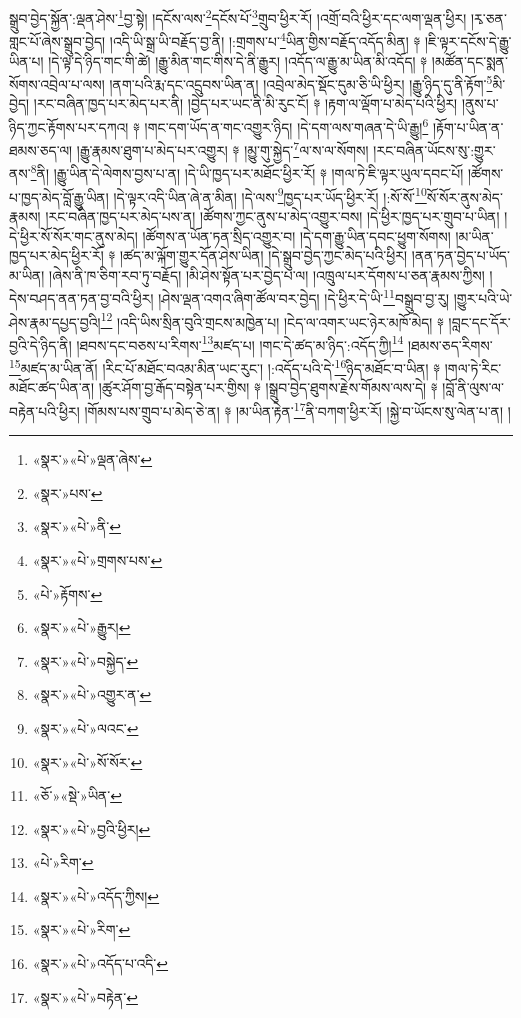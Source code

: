 སྒྲུབ་བྱེད་སྐྱོན་:ལྡན་ཤེས་\footnote{«སྣར་»«པེ་»ལྡན་ཞེས་}བྱ་སྟེ། །དངོས་ལས་\footnote{«སྣར་»པས་}དངོས་པོ་\footnote{«སྣར་»«པེ་»ནི་}གྲུབ་ཕྱིར་རོ། །འགྲོ་བའི་ཕྱིར་དང་ལག་ལྡན་ཕྱིར། །རྭ་ཅན་གླང་པོ་ཞེས་སྒྲུབ་བྱེད། །འདི་ཡི་སྒྲ་ཡི་བརྗོད་བྱ་ནི། །:གྲགས་པ་\footnote{«སྣར་»«པེ་»གྲགས་པས་}ཡིན་གྱིས་བརྗོད་འདོད་མིན། ༈ །ཇི་ལྟར་དངོས་དེ་རྒྱུ་ཡིན་པ། །དེ་ལྟ་དེ་ཉིད་གང་གི་ཚེ། །རྒྱུ་མིན་གང་གིས་དེ་ནི་རྒྱུར། །འདོད་ལ་རྒྱུ་མ་ཡིན་མི་འདོད། ༈ །མཚོན་དང་སྨན་སོགས་འབྲེལ་པ་ལས། །ནག་པའི་རྨ་དང་འདྲུབས་ཡིན་ན། །འབྲེལ་མེད་སྡོང་དུམ་ཅི་ཡི་ཕྱིར། །རྒྱུ་ཉིད་དུ་ནི་རྟོག་\footnote{«པེ་»རྟོགས་}མི་བྱེད། །རང་བཞིན་ཁྱད་པར་མེད་པར་ནི། །བྱེད་པར་ཡང་ནི་མི་རུང་ངོ། ༈ །རྟག་ལ་ལྡོག་པ་མེད་པའི་ཕྱིར། །ནུས་པ་ཉིད་ཀྱང་རྟོགས་པར་དཀའ། ༈ །གང་དག་ཡོད་ན་གང་འགྱུར་ཉིད། །དེ་དག་ལས་གཞན་དེ་ཡི་རྒྱུ།\footnote{«སྣར་»«པེ་»རྒྱུར།} །རྟོག་པ་ཡིན་ན་ཐམས་ཅད་ལ། །རྒྱུ་རྣམས་ཐུག་པ་མེད་པར་འགྱུར། ༈ །མྱུ་གུ་སྐྱེད་\footnote{«སྣར་»«པེ་»བསྐྱེད་}ལ་ས་ལ་སོགས། །རང་བཞིན་ཡོངས་སུ་:གྱུར་ནས་\footnote{«སྣར་»«པེ་»འགྱུར་ན་}ནི། །རྒྱུ་ཡིན་དེ་ལེགས་བྱས་པ་ན། །དེ་ཡི་ཁྱད་པར་མཐོང་ཕྱིར་རོ། ༈ །གལ་ཏེ་ཇི་ལྟར་ཡུལ་དབང་པོ། །ཚོགས་པ་ཁྱད་མེད་བློ་རྒྱུ་ཡིན། །དེ་ལྟར་འདི་ཡིན་ཞེ་ན་མིན། །དེ་ལས་\footnote{«སྣར་»«པེ་»ལའང་}ཁྱད་པར་ཡོད་ཕྱིར་རོ། །:སོ་སོ་\footnote{«སྣར་»«པེ་»སོ་སོར་}སོ་སོར་ནུས་མེད་རྣམས། །རང་བཞིན་ཁྱད་པར་མེད་པས་ན། །ཚོགས་ཀྱང་ནུས་པ་མེད་འགྱུར་བས། །དེ་ཕྱིར་ཁྱད་པར་གྲུབ་པ་ཡིན། །དེ་ཕྱིར་སོ་སོར་གང་ནུས་མེད། །ཚོགས་ན་ཡོན་ཏན་སྲིད་འགྱུར་བ། །དེ་དག་རྒྱུ་ཡིན་དབང་ཕྱུག་སོགས། །མ་ཡིན་ཁྱད་པར་མེད་ཕྱིར་རོ། ༈ །ཚད་མ་ལྐོག་གྱུར་དོན་ཤེས་ཡིན། །དེ་སྒྲུབ་བྱེད་ཀྱང་མེད་པའི་ཕྱིར། །ནན་ཏན་བྱེད་པ་ཡོད་མ་ཡིན། །ཞེས་ནི་ཁ་ཅིག་རབ་ཏུ་བརྗོད། །མི་ཤེས་སྟོན་པར་བྱེད་པ་ལ། །འཁྲུལ་པར་དོགས་པ་ཅན་རྣམས་ཀྱིས། །དེས་བཤད་ནན་ཏན་བྱ་བའི་ཕྱིར། །ཤེས་ལྡན་འགའ་ཞིག་ཚོལ་བར་བྱེད། །དེ་ཕྱིར་དེ་ཡི་\footnote{«ཅོ་»«སྡེ་»ཡིན་}བསྒྲུབ་བྱ་རུ། །གྱུར་པའི་ཡེ་ཤེས་རྣམ་དཔྱད་བྱའི།\footnote{«སྣར་»«པེ་»བྱའི་ཕྱིར།} །འདི་ཡིས་སྲིན་བུའི་གྲངས་མཁྱེན་པ། །ངེད་ལ་འགར་ཡང་ཉེར་མཁོ་མེད། ༈ །བླང་དང་དོར་བྱའི་དེ་ཉིད་ནི། །ཐབས་དང་བཅས་པ་རིགས་\footnote{«པེ་»རིག་}མཛད་པ། །གང་དེ་ཚད་མ་ཉིད་:འདོད་ཀྱི།\footnote{«སྣར་»«པེ་»འདོད་ཀྱིས།} །ཐམས་ཅད་རིགས་\footnote{«སྣར་»«པེ་»རིག་}མཛད་མ་ཡིན་ནོ། །རིང་པོ་མཐོང་བའམ་མིན་ཡང་རུང་། །:འདོད་པའི་དེ་\footnote{«སྣར་»«པེ་»འདོད་པ་འདི་}ཉིད་མཐོང་བ་ཡིན། ༈ །གལ་ཏེ་རིང་མཐོང་ཚད་ཡིན་ན། །ཚུར་ཤོག་བྱ་རྒོད་བསྟེན་པར་གྱིས། ༈ །སྒྲུབ་བྱེད་ཐུགས་རྗེས་གོམས་ལས་དེ། ༈ །བློ་ནི་ལུས་ལ་བརྟེན་པའི་ཕྱིར། །གོམས་པས་གྲུབ་པ་མེད་ཅེ་ན། ༈ །མ་ཡིན་རྟེན་\footnote{«སྣར་»«པེ་»བརྟེན་}ནི་བཀག་ཕྱིར་རོ། །སྐྱེ་བ་ཡོངས་སུ་ལེན་པ་ན། །
